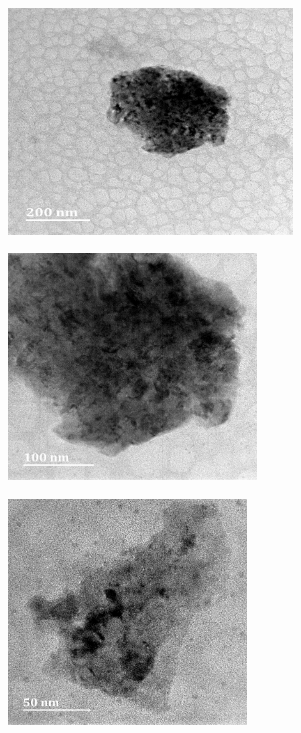 \documentclass[12pt]{report}
\begin{document}
\begin{figure}[H]
\centering

\begin{subfigure}{.45\textwidth}
    \includegraphics[height=6cm, width=\textwidth]{diffraction_image_5.png}
\end{subfigure}
\hspace{-1em}
\begin{subfigure}{.45\textwidth}
    \includegraphics[height=6cm, width=\textwidth]{diffraction_image_6.png}
\end{subfigure}
\par\bigskip
\begin{subfigure}{.45\textwidth}
    \includegraphics[height=6cm, width=\textwidth]{diffraction_image_7.png}
\end{subfigure}

\end{figure}
\end{document}

